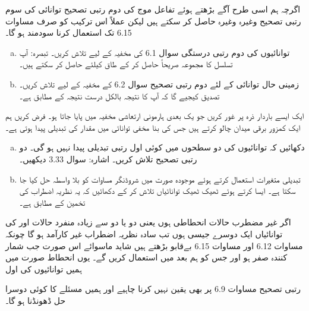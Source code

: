  اگرچہ ہم اسی طرح آگے بڑھتے ہوئے تفاعل موج  کی  دوم رتبی تصحیح   توانائی کی سوم  رتبی تصحیح  وغیرہ وغیرہ حاصل کر سکتے ہیں لیکن عملاً اس ترکیب کو صرف مساوات 6.15 تک استعمال کرنا سودمند  ہو گا۔
\begin{enumerate}[a.]
\item
توانائیوں کی  دوم رتبی درستگی  سوال 6.1 کی مخفیہ کے لیے تلاش کریں۔ تبصرہ: آپ تسلسل کا مجموعہ صریحاً حاصل کر کے طاق  کیلئے
  حاصل کر سکتے ہیں۔
\item
زمینی حال توانائی کے لئے دوم رتبی تصحیح   سوال 6.2 کے مخفیہ کے لیے تلاش کریں۔ تصدیق کیجیے گا کہ آپ کا نتیجہ بالکل درست نتیجہ کے مطابق ہے۔ 
\end{enumerate}
ایک ایسے  باردار  ذرہ پر غور کریں جو یک بعدی ہارمونی ارتعاشی مخفیہ  میں پایا جاتا ہو۔ فرض کریں  ہم ایک کمزور برقی میدان  چالو کرتے ہیں جس کی بنا مخفی توانائی میں  مقدار کی تبدیلی پیدا ہوتی ہے۔
\begin{enumerate}[a.]
\item
دکھائیں کہ توانائیوں کی  دو سطحوں میں کوئی اول رتبی تبدیلی پیدا نہیں ہو گی۔ دو رتبی تصحیح  تلاش کریں۔ اشارہ: سوال 3.33 دیکھیں۔
\item
تبدیلی متغیرات  استعمال کرتے ہوئے موجودہ صورت میں شروڈنگر مساوات کو بلا واسطہ حل کیا جا سکتا ہے۔ ایسا کرتے ہوئے ٹھیک ٹھیک توانائیاں تلاش کر کے دکھائیں کہ یہ نظریہ اضطراب کی تخمین کے مطابق ہے۔
\end{enumerate}

اگر غیر مضطرب حالات انحطاطی ہوں یعنی دو یا دو سے زیادہ منفرد حالات  اور  کی توانائیاں ایک دوسرے جیسی ہوں تب سادہ نظریہ اضطراب غیر کارآمد ہو گا  چونکہ  مساوات 6.12 اور  مساوات 6.15 بےقابو بڑھتے ہیں شاید  ماسوائے اس صورت جب شمار کنندہ صفر ہو  اور جس کو ہم بعد میں استعمال کریں گے۔ یوں  انحطاط صورت میں ہمیں توانائیوں کی اول 

رتبی تصحیح مساوات 6.9 پر بھی یقین نہیں کرنا چاہیے اور ہمیں مسئلے کا کوئی دوسرا حل ڈھونڈنا   ہو گا۔

